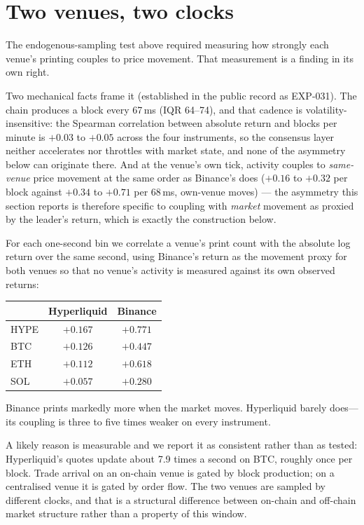 \documentclass[11pt,a4paper]{article}
\begin{document}
\section{Two venues, two clocks}
\label{sec:clocks}

The endogenous-sampling test above required measuring how strongly each venue's printing couples
to price movement. That measurement is a finding in its own right.

Two mechanical facts frame it (established in the public record as EXP-031). The chain produces
a block every 67\,ms (IQR 64--74), and that cadence is volatility-insensitive: the Spearman
correlation between absolute return and blocks per minute is $+0.03$ to $+0.05$ across the four
instruments, so the consensus layer neither accelerates nor throttles with market state, and none
of the asymmetry below can originate there. And at the venue's own tick, activity couples to
\emph{same-venue} price movement at the same order as Binance's does ($+0.16$ to $+0.32$ per
block against $+0.34$ to $+0.71$ per 68\,ms, own-venue moves) --- the asymmetry this section
reports is therefore specific to coupling with \emph{market} movement as proxied by the leader's
return, which is exactly the construction below.

For each one-second bin we correlate a venue's print count with the absolute log return over the
same second, using Binance's return as the movement proxy for both venues so that no venue's
activity is measured against its own observed returns:

\begin{center}
\begin{tabular}{lcc}
\toprule
 & Hyperliquid & Binance \\
\midrule
HYPE & $+0.167$ & $+0.771$ \\
BTC  & $+0.126$ & $+0.447$ \\
ETH  & $+0.112$ & $+0.618$ \\
SOL  & $+0.057$ & $+0.280$ \\
\bottomrule
\end{tabular}
\end{center}

Binance prints markedly more when the market moves. Hyperliquid barely does---its coupling is
three to five times weaker on every instrument.

A likely reason is measurable and we report it as consistent rather than as tested: Hyperliquid's
quotes update about 7.9 times a second on BTC, roughly once per block. Trade arrival on an on-chain
venue is gated by block production; on a centralised venue it is gated by order flow. The two
venues are sampled by different clocks, and that is a structural difference between on-chain and
off-chain market structure rather than a property of this window.
\end{document}
